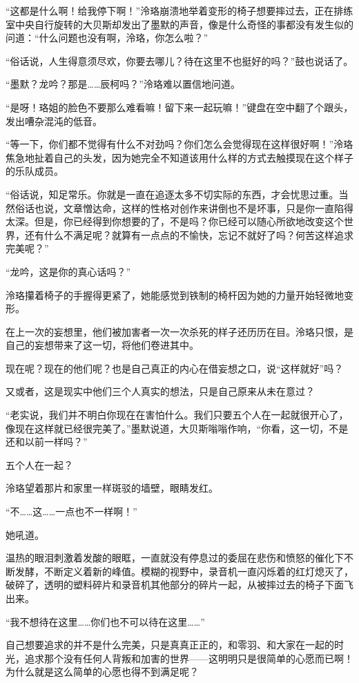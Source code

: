 \documentclass[UTF8, scheme = chinese, openany]{ctexbook}
\begin{document}
“这都是什么啊！给我停下啊！”泠珞崩溃地举着变形的椅子想要摔过去，正在排练室中央自行旋转的大贝斯却发出了墨默的声音，像是什么奇怪的事都没有发生似的问道：“什么问题也没有啊，泠珞，你怎么啦？”

“俗话说，人生得意须尽欢，你要去哪儿？待在这里不也挺好的吗？”鼓也说话了。

“墨默？龙吟？那是……辰柯吗？”泠珞难以置信地问道。

“是呀！珞姐的脸色不要那么难看嘛！留下来一起玩嘛！”键盘在空中翻了个跟头，发出嘈杂混沌的低音。

“等一下，你们都不觉得有什么不对劲吗？你们怎么会觉得现在这样很好啊！”泠珞焦急地扯着自己的头发，因为她完全不知道该用什么样的方式去触摸现在这个样子的乐队成员。

“俗话说，知足常乐。你就是一直在追逐太多不切实际的东西，才会忧思过重。当然俗话也说，文章憎达命，这样的性格对创作来讲倒也不是坏事，只是你一直陷得太深。但是，你已经得到你想要的了，不是吗？你已经可以随心所欲地改变这个世界，还有什么不满足呢？就算有一点点的不愉快，忘记不就好了吗？何苦这样追求完美呢？”

“龙吟，这是你的真心话吗？”

泠珞攥着椅子的手握得更紧了，她能感觉到铁制的椅杆因为她的力量开始轻微地变形。

在上一次的妄想里，他们被加害者一次一次杀死的样子还历历在目。泠珞只恨，是自己的妄想带来了这一切，将他们卷进其中。

现在呢？现在的他们呢？也是自己真正的内心在借妄想之口，说“这样就好”吗？

又或者，这是现实中他们三个人真实的想法，只是自己原来从未在意过？

“老实说，我们并不明白你现在在害怕什么。我们只要五个人在一起就很开心了，像现在这样就已经很完美了。”墨默说道，大贝斯嗡嗡作响，“你看，这一切，不是还和以前一样吗？”

五个人在一起？

泠珞望着那片和家里一样斑驳的墙壁，眼睛发红。

“不……这……一点也不一样啊！”

她吼道。

温热的眼泪刺激着发酸的眼眶，一直就没有停息过的委屈在悲伤和愤怒的催化下不断发酵，不断定义着新的峰值。模糊的视野中，录音机一直闪烁着的红灯熄灭了，破碎了，透明的塑料碎片和录音机其他部分的碎片一起，从被摔过去的椅子下面飞出来。

“我不想待在这里……你们也不可以待在这里……”

自己想要追求的并不是什么完美，只是真真正正的，和零羽、和大家在一起的时光，追求那个没有任何人背叛和加害的世界——这明明只是很简单的心愿而已啊！为什么就是这么简单的心愿也得不到满足呢？
\end{document}
